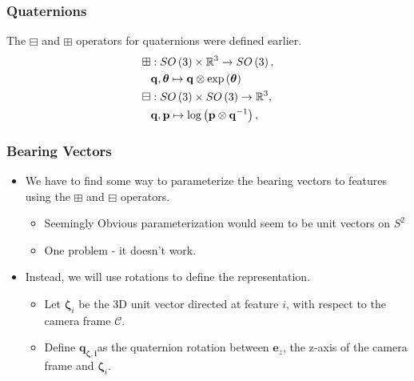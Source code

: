 \documentclass{beamer}
\begin{document}
\begin{frame}
\frametitle{Quaternions}
The $\boxminus$ and \textbf{$\boxplus$ }operators for quaternions
were defined earlier.
\begin{eqnarray}
\boxplus & :SO\left(3\right)\times\mathbb{R}^{3}\rightarrow SO\left(3\right),\\
 & {\bf q},\boldsymbol{\theta}\mapsto{\bf q}\otimes\exp\left(\boldsymbol{\theta}\right)\\
\boxminus & :SO\left(3\right)\times SO\left(3\right)\rightarrow\mathbb{R}^{3},\\
 & {\bf q},{\bf p}\mapsto\log\left({\bf p}\otimes{\bf q}^{-1}\right),
\end{eqnarray}
\end{frame}

\begin{frame}
\frametitle{Bearing Vectors}
\begin{itemize}
	\item We have to find some way to parameterize the bearing vectors to features
using the $\boxplus$ and $\boxminus$ operators. 
\begin{itemize}
	\item Seemingly Obvious parameterization would seem to be unit vectors on $S^{2}$
	\item One problem - it doesn't work.
\end{itemize}
\item Instead, we will use rotations to define the representation. 


\begin{itemize}
	\item Let $\boldsymbol{\zeta}_{i}$ be the 3D unit vector directed at feature $i$, with respect to the camera frame $\mathcal{C}$. 
	\item Define $\boldsymbol{q}_{\boldsymbol{\zeta,i}}$as
	the quaternion rotation between $\boldsymbol{e}_{z}$, the z-axis
	of the camera frame and $\boldsymbol{\zeta}_{i}$.
\end{itemize}
\end{itemize}
\end{frame}
\end{document}
